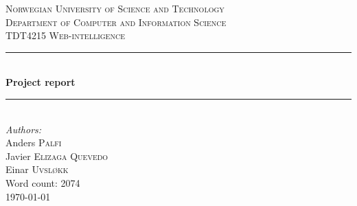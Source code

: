 \documentclass[11pt,a4paper]{report}
\newcommand{\HRule}{\rule{\linewidth}{0.5mm}}
\begin{document}
\begin{titlepage}
\center
\textsc{\Large Norwegian University of Science and Technology}\\[1.5cm]
\textsc{\large Department of Computer and Information Science}\\[0.5cm]
\textsc{TDT4215 Web-intelligence}\\[0.5cm]

\HRule \\[0.5cm]
{\huge \bfseries Project report}\\[0.2cm]
\HRule \\[1.5cm]

\Large \emph{Authors:}\\
Anders \textsc{Palfi}\\
Javier \textsc{Elizaga Quevedo}\\
Einar \textsc{Uvsløkk}\\[3cm]

{\large Word count: 2074}\\
{\large \today}\\[3cm]

\vfill

\end{titlepage}


\tableofcontents

\listoffigures
{}
\listoftables
{}










%
%


\end{document}
